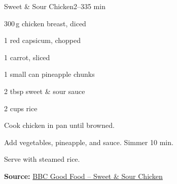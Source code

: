 \begin{recipebox}{Sweet \& Sour Chicken}{2--3}{35 min}
\begin{ingredients}
  \item 300\,g chicken breast, diced
  \item 1 red capsicum, chopped
  \item 1 carrot, sliced
  \item 1 small can pineapple chunks
  \item 2 tbsp sweet \& sour sauce
  \item 2 cups rice
\end{ingredients}

\begin{method}
  \item Cook chicken in pan until browned.
  \item Add vegetables, pineapple, and sauce. Simmer 10 min.
  \item Serve with steamed rice.
\end{method}
\textbf{Source:} \href{https://www.bbcgoodfood.com/recipes/sweet-sour-chicken}{BBC Good Food – Sweet \& Sour Chicken}
\end{recipebox}
